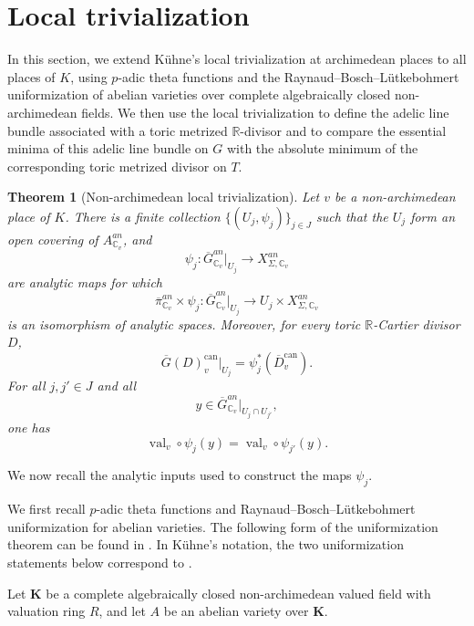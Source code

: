 \documentclass[10pt,a4paper]{amsart}
\theoremstyle{plain}
\theoremstyle{plain}
\newtheorem{thm}{Theorem}[section] \newtheorem{cor}[thm]{Corollary}
\numberwithin{equation}{section}
\begin{document}
\section{Local trivialization}
In this section, we extend K\"uhne's local trivialization at archimedean places
to all places of \(K\), using \(p\)-adic theta functions and the
Raynaud--Bosch--L\"utkebohmert uniformization of abelian varieties over
complete algebraically closed non-archimedean fields.  We then use the local
trivialization to define the adelic line bundle associated with a toric
metrized \(\mathbb R\)-divisor and to compare the essential minima of this
adelic line bundle on \(G\) with the absolute minimum of the corresponding
toric metrized divisor on \(T\).
\begin{thm}[Non-archimedean local trivialization]\label{thm:local-trivialization}
	Let \(v\) be a non-archimedean place of \(K\).  There is a finite collection
	\(\{(U_j,\psi_j)\}_{j\in J}\) such that the \(U_j\) form an open covering of
	\(A^{an}_{\mathbb C_v}\), and
	\[
	\psi_j:
	\overline{G}^{an}_{\mathbb C_v}|_{U_j}
	\longrightarrow
	X_{\Sigma,\mathbb C_v}^{an}
	\]
	are analytic maps for which
	\[
	\overline{\pi}^{an}_{\mathbb C_v}\times\psi_j:
	\overline{G}^{an}_{\mathbb C_v}|_{U_j}
	\longrightarrow
	U_j\times X_{\Sigma,\mathbb C_v}^{an}
	\]
	is an isomorphism of analytic spaces.  Moreover, for every toric
	\(\mathbb R\)-Cartier divisor \(D\),
	\[
	\overline{G}(D)^{\mathrm{can}}_v|_{U_j}
	=
	\psi_j^*(\overline{D}^{\mathrm{can}}_v).
	\]
	For all \(j,j'\in J\) and all
	\[
	y\in \overline{G}^{an}_{\mathbb C_v}|_{U_j\cap U_{j'}},
	\]
	one has
	\[
	\operatorname{val}_v\circ\psi_j(y)
	=
	\operatorname{val}_v\circ\psi_{j'}(y).
	\]
\end{thm}
We now recall the analytic inputs used to construct the maps \(\psi_j\).


We first recall \(p\)-adic theta functions and Raynaud--Bosch--L\"utkebohmert
uniformization for abelian varieties.  The following form of the
uniformization theorem can be found in \cite{FRSS}.  In K\"uhne's notation,
the two uniformization statements below correspond to
\cite[Section~3.2]{Ku1}.


Let \(\mathbf K\) be a complete algebraically closed non-archimedean valued
field with valuation ring \(R\), and let \(A\) be an abelian variety over
\(\mathbf K\).
\end{document}
